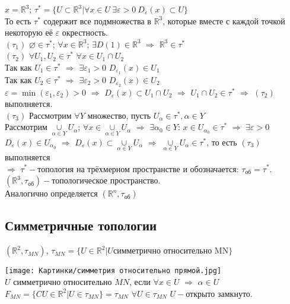 \begin{example}
$x=\mathbb{R}^3$; $\tau^*=\{U{\subset}\mathbb{R}^3|\forall x{\in}U \ \exists \varepsilon>0 \ D_{\varepsilon}(x){\subset}U\}$\\
То есть $\tau^*$ содержит все подмножества в $\mathbb{R}^3$, которые вместе с каждой точкой некоторую её $\varepsilon$ окрестность.\\
$(\tau_1)$ $\varnothing{\in}\tau^*$; $\forall x{\in}\mathbb{R}^3$; $\exists D(1){\in}\mathbb{R}^3$ $\Rightarrow$ $\mathbb{R}^3{\in}\tau^*$\\
$(\tau_2)$ $\forall U_1,U_2{\in}\tau^*$ $\forall x{\in}U_1{\cap}U_2$\\
Так как $U_1{\in}\tau^*$ $\Rightarrow$ $\exists \varepsilon_1>0$ $D_{\varepsilon_1}(x){\in}U_1$\\
Так как $U_2{\in}\tau^*$ $\Rightarrow$ $\exists \varepsilon_2>0$ $D_{\varepsilon_2}(x){\in}U_2$\\
$\varepsilon=\min(\varepsilon_1,\varepsilon_2)>0$ $\Rightarrow$ $D_{\varepsilon}(x){\subset}U_1{\cap}U_2$ $\Rightarrow$ $U_1{\cap}U_2{\in}\tau^*$ $\Rightarrow$ $(\tau_2)$ выполняется.\\
$(\tau_3)$ Рассмотрим $\forall Y$ множество, пусть $U_{\alpha}{\in}\tau^*, \alpha{\in}Y$\\
Рассмотрим $\underset{\alpha{\in}Y}{\cup}U_{\alpha}$; $\forall x{\in}\underset{\alpha{\in}Y}{\cup}U_{\alpha}$ $\Rightarrow$ $\exists \alpha_0{\in}Y$: $x{\in}U_{\alpha_0}{\in}\tau^*$ $\Rightarrow$ $\exists\varepsilon>0$ $D_{\varepsilon}(x){\in}U_{\alpha_0}$ $\Rightarrow$ $D_{\varepsilon}(x){\subset}\underset{\alpha{\in}Y}{\cup}U_{\alpha}$ $\Rightarrow$ $\underset{\alpha{\in}Y}{\cup}U_{\alpha}{\in}\tau^*$, то есть $(\tau_3)$ выполняется\\
$\Rightarrow$ $\tau^*-$топология на трёхмерном пространстве и обозначается: $\tau_{\text{об}}=\tau^*$. $(\mathbb{R}^3,\tau_{\text{об}})-$топологическое пространство.\\
Аналогично определяется $(\mathbb{R}^n,\tau_{\text{об}})$
\end{example}

\subsection{Симметричные топологии}
$(\mathbb{R}^2,\tau_{MN})$, $\tau_{MN}=\{U{\in}\mathbb{R}^2|U\text{симметрично относительно MN}\}$

\texttt{[image: Картинки/симметрия относительно прямой.jpg]}\\
$U$ симметрично относительно $MN$, если $\forall x{\in}U$ $\Rightarrow$ $\alpha{\in}U$\\
$F_{MN}=\{CU{\in}\mathbb{R}^2|U{\in}\tau_{MN}\}=\tau_{MN}$
$\forall U{\in}\tau_{MN}$ $U-$открыто замкнуто.


